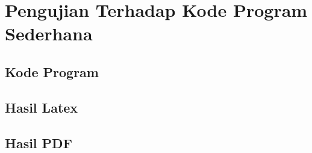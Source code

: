 \chapter{Pengujian Terhadap Kode Program Sederhana}
\label{lamp:A}

\section{Kode Program}
\label{kodeProgram:A}





\section{Hasil Latex}
\label{hasilLatex:A}

\section{Hasil PDF}
\label{hasilPDF:A}












